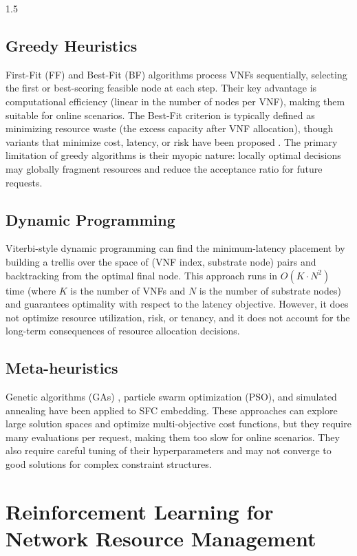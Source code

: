 \documentclass[A4paper,12pt]{report}
\theoremstyle{plain}
\theoremstyle{definition}
\theoremstyle{remark}
\numberwithin{equation}{section}
\begin{document}
\begin{spacing}{1.5}
\subsection{Greedy Heuristics}

First-Fit (FF) and Best-Fit (BF) algorithms process VNFs sequentially, selecting the first or best-scoring feasible node at each step. Their key advantage is computational efficiency (linear in the number of nodes per VNF), making them suitable for online scenarios. The Best-Fit criterion is typically defined as minimizing resource waste (the excess capacity after VNF allocation), though variants that minimize cost, latency, or risk have been proposed \cite{bhamare2016}. The primary limitation of greedy algorithms is their myopic nature: locally optimal decisions may globally fragment resources and reduce the acceptance ratio for future requests.

\subsection{Dynamic Programming}

Viterbi-style dynamic programming \cite{viterbi1967} can find the minimum-latency placement by building a trellis over the space of (VNF index, substrate node) pairs and backtracking from the optimal final node. This approach runs in $O(K \cdot N^2)$ time (where $K$ is the number of VNFs and $N$ is the number of substrate nodes) and guarantees optimality with respect to the latency objective. However, it does not optimize resource utilization, risk, or tenancy, and it does not account for the long-term consequences of resource allocation decisions.

\subsection{Meta-heuristics}

Genetic algorithms (GAs) \cite{rankothge2017}, particle swarm optimization (PSO), and simulated annealing have been applied to SFC embedding. These approaches can explore large solution spaces and optimize multi-objective cost functions, but they require many evaluations per request, making them too slow for online scenarios. They also require careful tuning of their hyperparameters and may not converge to good solutions for complex constraint structures.

\section{Reinforcement Learning for Network Resource Management}


\end{spacing}
\end{document}
